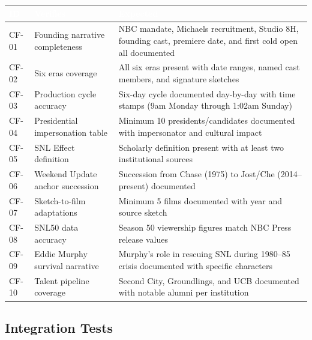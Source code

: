 \documentclass[11pt,letterpaper]{article}
\newcommand{\tableheader}[1]{\textbf{\sffamily\textcolor{white}{#1}}}
\begin{document}
\begin{center}
\begin{tabularx}{\textwidth}{L{1.5cm}XL{3.5cm}}
\toprule
{}
\tableheader{ID} & \tableheader{Verifies} & \tableheader{Expected} \\
\midrule
CF-01 & Founding narrative completeness & NBC mandate, Michaels recruitment, Studio 8H, founding cast, premiere date, and first cold open all documented \\
CF-02 & Six eras coverage & All six eras present with date ranges, named cast members, and signature sketches \\
CF-03 & Production cycle accuracy & Six-day cycle documented day-by-day with time stamps (9am Monday through 1:02am Sunday) \\
CF-04 & Presidential impersonation table & Minimum 10 presidents/candidates documented with impersonator and cultural impact \\
CF-05 & SNL Effect definition & Scholarly definition present with at least two institutional sources \\
CF-06 & Weekend Update anchor succession & Succession from Chase (1975) to Jost/Che (2014--present) documented \\
CF-07 & Sketch-to-film adaptations & Minimum 5 films documented with year and source sketch \\
CF-08 & SNL50 data accuracy & Season 50 viewership figures match NBC Press release values \\
CF-09 & Eddie Murphy survival narrative & Murphy's role in rescuing SNL during 1980--85 crisis documented with specific characters \\
CF-10 & Talent pipeline coverage & Second City, Groundlings, and UCB documented with notable alumni per institution \\
\bottomrule
\end{tabularx}
\end{center}

\subsection{Integration Tests}
\end{document}
